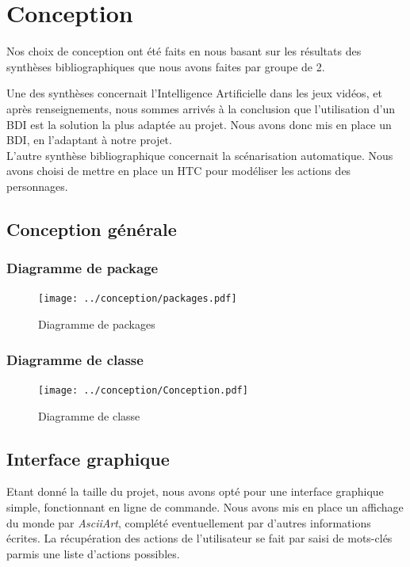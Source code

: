 \documentclass[asi]{picINSA}
\begin{document}
\chapter{Conception}
Nos choix de conception ont été faits en nous basant sur les résultats des synthèses bibliographiques que nous avons faites par groupe de 2. \newline

Une des synthèses concernait l'Intelligence Artificielle dans les jeux vidéos, et après renseignements, nous sommes arrivés à la conclusion que l'utilisation d'un BDI est la solution la plus adaptée au projet. Nous avons donc mis en place un BDI, en l'adaptant à notre projet. \\

L'autre synthèse bibliographique concernait la scénarisation automatique. Nous avons choisi de mettre en place un HTC pour modéliser les actions des personnages. \\

\section{Conception générale}

\subsection{Diagramme de package}
\begin{figure}[!ht]
  \begin{center}
    \texttt{[image: ../conception/packages.pdf]}
    \caption{Diagramme de packages}	
  \end{center}
\end{figure}



\subsection{Diagramme de classe}
\begin{figure}[!ht]
  \begin{center}
    \texttt{[image: ../conception/Conception.pdf]}
    \caption{Diagramme de classe}	
  \end{center}
\end{figure}



\section{Interface graphique}
Etant donné la taille du projet, nous avons opté pour une interface graphique simple, fonctionnant en ligne de commande. Nous avons mis en place un affichage du monde par \textit{AsciiArt}, complété eventuellement par d'autres informations écrites. La récupération des actions de l'utilisateur se fait par saisi de mots-clés parmis une liste d'actions possibles.
\end{document}
